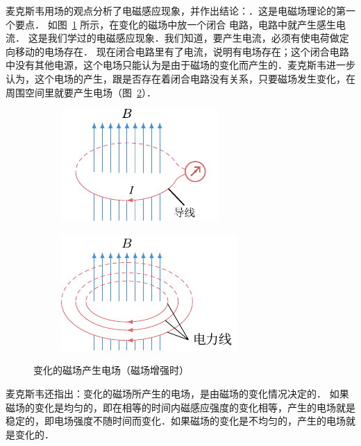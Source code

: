 麦克斯韦用场的观点分析了电磁感应现象，并作出结论：．这是电磁场理论的第一个要点．
如图~\ref{fig_C_4-4a} 所示，在变化的磁场中放一个闭合
电路，电路中就产生感生电流．
这是我们学过的电磁感应现象．我们知道，要产生电流，必须有使电荷做定向移动的电场存在．
现在闭合电路里有了电流，说明有电场存在；这个闭合电路中没有其他电源，这个电场只能认为是由于磁场的变化而产生的．麦克斯韦进一步认为，这个电场的产生，跟是否存在着闭合电路没有关系，只要磁场发生变化，在周围空间里就要产生电场（图~\ref{fig_C_4-4b}）．
\begin{figure}[htbp]
    \centering
     \begin{subfigure}{0.43\linewidth}
    	\centering
    	\includegraphics{fig/C/4-4a.pdf}
    	\caption{}\label{fig_C_4-4a}
    \end{subfigure}
    \begin{subfigure}{0.5\linewidth}
    	\centering
    	\includegraphics{fig/C/4-4b.pdf}
    	\caption{}\label{fig_C_4-4b}
    \end{subfigure}
    \caption{变化的磁场产生电场（磁场增强时）}\label{fig_C_4-4}
\end{figure}

麦克斯韦还指出：变化的磁场所产生的电场，是由磁场的变化情况决定的．
如果磁场的变化是均匀的，即在相等的时间内磁感应强度的变化相等，产生的电场就是稳定的，即电场强度不随时间而变化．如果磁场的变化是不均匀的，产生的电场就是变化的．

